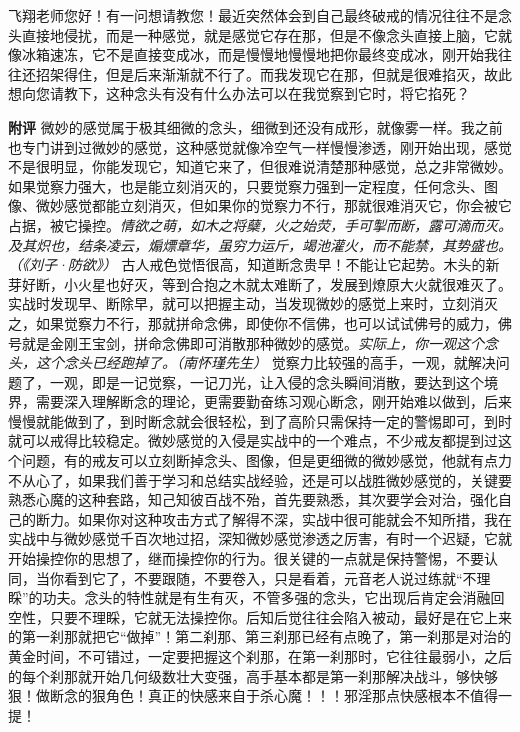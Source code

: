 \begin{case}
    飞翔老师您好！有一问想请教您！最近突然体会到自己最终破戒的情况往往不是念头直接地侵扰，而是一种感觉，就是感觉它存在那，但是不像念头直接上脑，它就像冰箱速冻，它不是直接变成冰，而是慢慢地慢慢地把你最终变成冰，刚开始我往往还招架得住，但是后来渐渐就不行了。而我发现它在那，但就是很难掐灭，故此想向您请教下，这种念头有没有什么办法可以在我觉察到它时，将它掐死？

    \textbf{附评} 微妙的感觉属于极其细微的念头，细微到还没有成形，就像雾一样。我之前也专门讲到过微妙的感觉，这种感觉就像冷空气一样慢慢渗透，刚开始出现，感觉不是很明显，你能发现它，知道它来了，但很难说清楚那种感觉，总之非常微妙。如果觉察力强大，也是能立刻消灭的，只要觉察力强到一定程度，任何念头、图像、微妙感觉都能立刻消灭，但如果你的觉察力不行，那就很难消灭它，你会被它占据，被它操控。\textit{情欲之萌，如木之将蘖，火之始荧，手可掣而断，露可滴而灭。及其炽也，结条凌云，煽熛章华，虽穷力运斤，竭池灌火，而不能禁，其势盛也。（《刘子·防欲》）} 古人戒色觉悟很高，知道断念贵早！不能让它起势。木头的新芽好断，小火星也好灭，等到合抱之木就太难断了，发展到燎原大火就很难灭了。实战时发现早、断除早，就可以把握主动，当发现微妙的感觉上来时，立刻消灭之，如果觉察力不行，那就拼命念佛，即使你不信佛，也可以试试佛号的威力，佛号就是金刚王宝剑，拼命念佛即可消散那种微妙的感觉。\textit{实际上，你一观这个念头，这个念头已经跑掉了。（南怀瑾先生）} 觉察力比较强的高手，一观，就解决问题了，一观，即是一记觉察，一记刀光，让入侵的念头瞬间消散，要达到这个境界，需要深入理解断念的理论，更需要勤奋练习观心断念，刚开始难以做到，后来慢慢就能做到了，到时断念就会很轻松，到了高阶只需保持一定的警惕即可，到时就可以戒得比较稳定。微妙感觉的入侵是实战中的一个难点，不少戒友都提到过这个问题，有的戒友可以立刻断掉念头、图像，但是更细微的微妙感觉，他就有点力不从心了，如果我们善于学习和总结实战经验，还是可以战胜微妙感觉的，关键要熟悉心魔的这种套路，知己知彼百战不殆，首先要熟悉，其次要学会对治，强化自己的断力。如果你对这种攻击方式了解得不深，实战中很可能就会不知所措，我在实战中与微妙感觉千百次地过招，深知微妙感觉渗透之厉害，有时一个迟疑，它就开始操控你的思想了，继而操控你的行为。很关键的一点就是保持警惕，不要认同，当你看到它了，不要跟随，不要卷入，只是看着，元音老人说过练就“不理睬”的功夫。念头的特性就是有生有灭，不管多强的念头，它出现后肯定会消融回空性，只要不理睬，它就无法操控你。后知后觉往往会陷入被动，最好是在它上来的第一刹那就把它“做掉”！第二刹那、第三刹那已经有点晚了，第一刹那是对治的黄金时间，不可错过，一定要把握这个刹那，在第一刹那时，它往往最弱小，之后的每个刹那就开始几何级数壮大变强，高手基本都是第一刹那解决战斗，够快够狠！做断念的狠角色！真正的快感来自于杀心魔！！！邪淫那点快感根本不值得一提！
\end{case}

